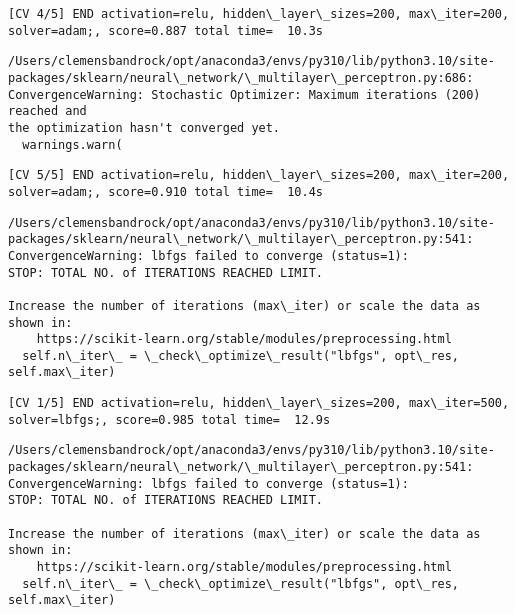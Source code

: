 \documentclass[11pt]{article}
\begin{document}
    \begin{Verbatim}[commandchars=\\\{\}]
[CV 4/5] END activation=relu, hidden\_layer\_sizes=200, max\_iter=200,
solver=adam;, score=0.887 total time=  10.3s
    \end{Verbatim}

    \begin{Verbatim}[commandchars=\\\{\}]
/Users/clemensbandrock/opt/anaconda3/envs/py310/lib/python3.10/site-
packages/sklearn/neural\_network/\_multilayer\_perceptron.py:686:
ConvergenceWarning: Stochastic Optimizer: Maximum iterations (200) reached and
the optimization hasn't converged yet.
  warnings.warn(
    \end{Verbatim}

    \begin{Verbatim}[commandchars=\\\{\}]
[CV 5/5] END activation=relu, hidden\_layer\_sizes=200, max\_iter=200,
solver=adam;, score=0.910 total time=  10.4s
    \end{Verbatim}

    \begin{Verbatim}[commandchars=\\\{\}]
/Users/clemensbandrock/opt/anaconda3/envs/py310/lib/python3.10/site-
packages/sklearn/neural\_network/\_multilayer\_perceptron.py:541:
ConvergenceWarning: lbfgs failed to converge (status=1):
STOP: TOTAL NO. of ITERATIONS REACHED LIMIT.

Increase the number of iterations (max\_iter) or scale the data as shown in:
    https://scikit-learn.org/stable/modules/preprocessing.html
  self.n\_iter\_ = \_check\_optimize\_result("lbfgs", opt\_res, self.max\_iter)
    \end{Verbatim}

    \begin{Verbatim}[commandchars=\\\{\}]
[CV 1/5] END activation=relu, hidden\_layer\_sizes=200, max\_iter=500,
solver=lbfgs;, score=0.985 total time=  12.9s
    \end{Verbatim}

    \begin{Verbatim}[commandchars=\\\{\}]
/Users/clemensbandrock/opt/anaconda3/envs/py310/lib/python3.10/site-
packages/sklearn/neural\_network/\_multilayer\_perceptron.py:541:
ConvergenceWarning: lbfgs failed to converge (status=1):
STOP: TOTAL NO. of ITERATIONS REACHED LIMIT.

Increase the number of iterations (max\_iter) or scale the data as shown in:
    https://scikit-learn.org/stable/modules/preprocessing.html
  self.n\_iter\_ = \_check\_optimize\_result("lbfgs", opt\_res, self.max\_iter)
    \end{Verbatim}
\end{document}
